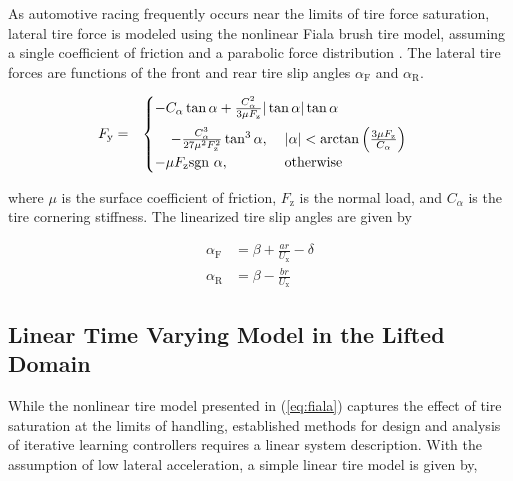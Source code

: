 \documentclass[letterpaper, 10 pt, conference]{ieeeconf}  %
\begin{document}
As automotive racing frequently occurs near the limits of tire force saturation, 
lateral tire force is modeled using the nonlinear Fiala brush tire model, assuming a single coefficient of friction and a parabolic force distribution \cite{Pacejka2012}.
 The lateral tire forces are functions of the front and rear tire slip angles $\alpha_\mathrm{F}$ and $\alpha_\mathrm{R}$. 

\begin{eqnarray}
\label{eq:fiala}
\small
	F_\mathrm{y}&=&\begin{cases} -C_{\alpha}\tan\alpha + \frac{C_{\alpha}^2}{3\mu F_\mathrm{z}} |\tan\alpha| \tan\alpha \vspace{2mm} \\ \hspace{4mm}- \frac{C_{\alpha}^3}{27\mu^2F_\mathrm{z}^2}\tan^3\alpha,
\hspace{4mm}  |\alpha| < \arctan{\left(\frac{3\mu F_\mathrm{z}}{C_\alpha}\right)} \\ -\mu F_\mathrm{z}\text{sgn} \ \alpha, \hspace{14mm} \mathrm{otherwise} \end{cases} \nonumber\\
\end{eqnarray}

where $\mu$ is the surface coefficient of friction, $F_\mathrm{z}$ is the normal load, and $C_\alpha$ is the tire cornering stiffness. The linearized tire slip angles are given by

\begin{subequations}
\begin{align}
	\alpha_\mathrm{F} &= \beta + \frac{ar}{U_\mathrm{x}} - \delta\\
	\alpha_\mathrm{R} &= \beta - \frac{br}{U_\mathrm{x}}
\end{align}
\end{subequations}
 

\subsection{Linear Time Varying Model in the Lifted Domain}

While the nonlinear tire model presented in (\ref{eq:fiala}) captures the effect of tire saturation at the limits of handling, established methods for design and analysis
of iterative learning controllers requires a linear system description. With the assumption of low lateral acceleration, a simple linear tire model is given by, 
\end{document}
